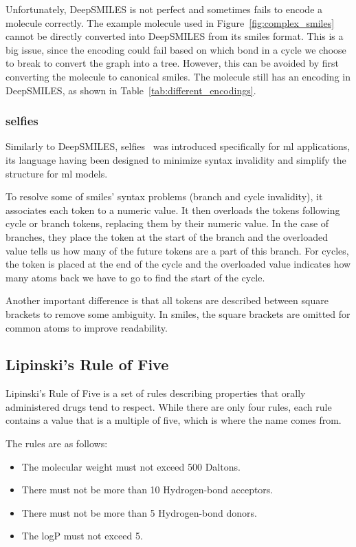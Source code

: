 \documentclass[../Document.tex]{subfiles}
\begin{document}
Unfortunately, DeepSMILES is not perfect and sometimes fails to encode a molecule correctly. The example molecule used in Figure~\ref{fig:complex_smiles} cannot be directly converted into DeepSMILES from its \gls{smiles} format. This is a big issue, since the encoding could fail based on which bond in a cycle we choose to break to convert the graph into a tree. However, this can be avoided by first converting the molecule to canonical \gls{smiles}. The molecule still has an encoding in DeepSMILES, as shown in Table~\ref{tab:different_encodings}.

\subsubsection{\acrshort{selfies}}
Similarly to DeepSMILES, \gls{selfies}~\cite{selfies_intro} was introduced specifically for \gls{ml} applications, its language having been designed to minimize syntax invalidity and simplify the structure for \gls{ml} models.

To resolve some of \gls{smiles}' syntax problems (\ie branch and cycle invalidity), it associates each token to a numeric value. It then overloads the tokens following cycle or branch tokens, replacing them by their numeric value. In the case of branches, they place the token at the start of the branch and the overloaded value tells us how many of the future tokens are a part of this branch. For cycles, the token is placed at the end of the cycle and the overloaded value indicates how many atoms back we have to go to find the start of the cycle.

Another important difference is that all tokens are described between square brackets to remove some ambiguity. In \gls{smiles}, the square brackets are omitted for common atoms to improve readability.


\subsection{Lipinski's Rule of Five}
Lipinski's Rule of Five is a set of rules describing properties that orally administered drugs tend to respect. While there are only four rules, each rule contains a value that is a multiple of five, which is where the name comes from. 

The rules are as follows:
\begin{itemize}
    \item The molecular weight must not exceed 500 Daltons.
    \item There must not be more than 10 Hydrogen-bond acceptors.
    \item There must not be more than 5 Hydrogen-bond donors.
    \item The logP must not exceed 5.
\end{itemize}
\end{document}
